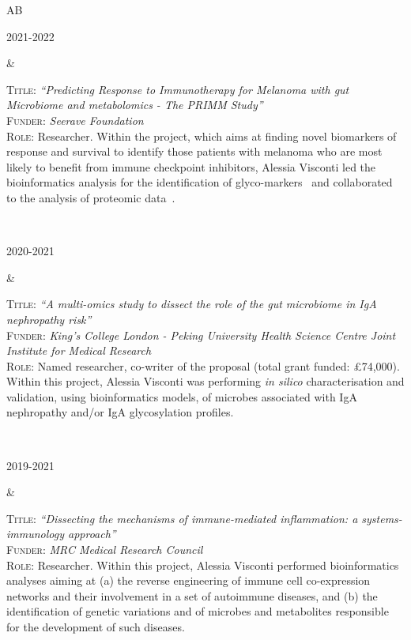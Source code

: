\documentclass[a4paper,10pt]{article}
\newenvironment{doubletablelist}
{
	\vspace{-0.2cm}
	\begin{longtable}[!h]{AB}}{\end{longtable}
}
\newcommand{\dtlist}[2]{
\hspace{-3cm}
\noindent
	\begin{minipage}{0.22\textwidth}
	\begin{flushright}
	\textsc{#1}
	\end{flushright}
	\end{minipage}
	& #2\\[0.2cm]
}
\begin{document}
\begin{doubletablelist}
	\dtlist{2021-2022}{  \begin{minipage}[t]{0.65\textwidth}
		\textsc{Title:} \emph{``Predicting Response to Immunotherapy for Melanoma with gut Microbiome and metabolomics - The PRIMM Study''}\\
		\textsc{Funder:} \emph{Seerave Foundation}\\
		\textsc{Role:} Researcher. Within the project, which aims at finding novel biomarkers of response and survival to identify those patients with melanoma who are most likely to benefit from immune checkpoint inhibitors, Alessia Visconti led the bioinformatics analysis for the identification of glyco-markers~\cite{Vis23} and collaborated to the analysis of proteomic data~\cite{Ros22}.
	\end{minipage}}

	\dtlist{2020-2021}{  \begin{minipage}[t]{0.65\textwidth}
		\textsc{Title:} \emph{``A multi-omics study to dissect the role of the gut microbiome in IgA nephropathy risk''}\\
		\textsc{Funder:} \emph{King's College London - Peking University Health Science Centre Joint Institute for Medical Research}\\
		\textsc{Role:} Named researcher, co-writer of the proposal (total grant funded: £74,000). Within this project, Alessia Visconti was performing \emph{in silico} characterisation and validation, using bioinformatics models, of microbes associated with IgA nephropathy and/or IgA glycosylation profiles.
	\end{minipage}}
	
	\dtlist{2019-2021}{  \begin{minipage}[t]{0.65\textwidth}
		\textsc{Title:} \emph{``Dissecting the mechanisms of immune-mediated inflammation: a systems-immunology approach''}\\
		\textsc{Funder:} \emph{MRC Medical Research Council}\\
		\textsc{Role:} Researcher. Within this project, Alessia Visconti performed bioinformatics analyses aiming at (a) the reverse engineering of immune cell co-expression networks and their involvement in a set of autoimmune diseases, and (b) the identification of genetic variations and of microbes and metabolites responsible for the development of such diseases.
	\end{minipage}}
	

\end{doubletablelist}
\end{document}
